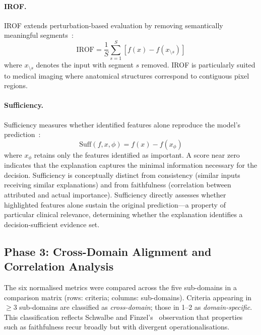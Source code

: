 \paragraph{IROF.}
IROF extends perturbation-based evaluation by removing semantically meaningful segments~\cite{rieger2020irof}:
\begin{equation}
\text{IROF} = \frac{1}{S} \sum_{s=1}^{S} \left[ f(x) - f(x_{\setminus s}) \right]
\label{eq:irof}
\end{equation}
where $x_{\setminus s}$ denotes the input with segment $s$ removed. IROF is particularly suited to medical imaging where anatomical structures correspond to contiguous pixel regions.

\paragraph{Sufficiency.}
Sufficiency measures whether identified features alone reproduce the model's prediction~\cite{yeh2019fidelity}:
\begin{equation}
\text{Suff}(f, x, \phi) = f(x) - f(x_{\phi})
\label{eq:sufficiency}
\end{equation}
where $x_{\phi}$ retains only the features identified as important. A score near zero indicates that the explanation captures the minimal information necessary for the decision. Sufficiency is conceptually distinct from consistency (similar inputs receiving similar explanations) and from faithfulness (correlation between attributed and actual importance). Sufficiency directly assesses whether highlighted features alone sustain the original prediction---a property of particular clinical relevance, determining whether the explanation identifies a decision-sufficient evidence set.

\subsection{Phase 3: Cross-Domain Alignment and Correlation Analysis}

The six normalised metrics were compared across the five sub-domains in a comparison matrix (rows: criteria; columns: sub-domains). Criteria appearing in $\geq 3$ sub-domains are classified as \emph{cross-domain}; those in 1--2 as \emph{domain-specific}. This classification reflects Schwalbe and Finzel's~\cite{schwalbe2024comprehensive} observation that properties such as faithfulness recur broadly but with divergent operationalisations.

